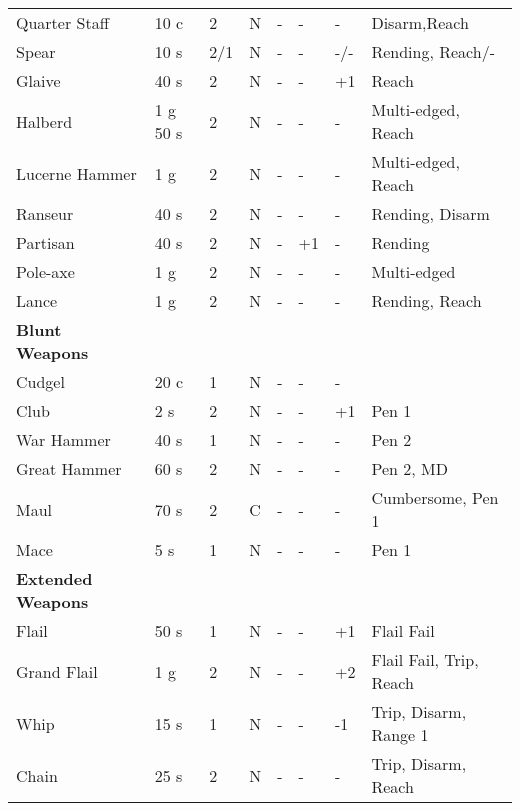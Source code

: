 \begin{table}[ht!]
\begin{tabular}{|l|l|l|l|l|l|l|l|}
		Quarter Staff & 10 c & 2 &  N & - & - & - & Disarm,Reach\\
		Spear & 10 s & 2/1 & N & - & - & -/- & Rending, Reach/- \\
		Glaive & 40 s & 2 & N & - & - & +1 & Reach \\
		Halberd & 1 g 50 s & 2 & N & - & - & - & Multi-edged, Reach\\
		Lucerne Hammer & 1 g & 2 & N & - & - & - & Multi-edged, Reach\\ 
		Ranseur & 40 s & 2 & N & - & - & - & Rending, Disarm \\ 
		Partisan & 40 s & 2 & N & - & +1 & - & Rending\\
        Pole-axe & 1 g & 2 & N & - & - & - & Multi-edged \\
		Lance & 1 g & 2 & N & - & - & - & Rending, Reach\\
		\hline
		\textbf{Blunt Weapons} & & & & & & & \\
		\hline
		Cudgel & 20 c & 1  & N & - & - & - &  \\
		Club & 2 s & 2 & N & - & - & +1 & Pen 1 \\
		War Hammer & 40 s & 1 & N & - & - & - & Pen 2 \\ 
		Great Hammer & 60 s & 2 & N & - & - & - & Pen 2, MD \\
		Maul & 70 s & 2 & C & - & - & - & Cumbersome, Pen 1 \\
		Mace & 5 s & 1 & N & - & - & - & Pen 1 \\
		\hline
		\textbf{Extended Weapons} & & & & & & & \\
		\hline
		Flail & 50 s & 1 & N & - & - & +1 & Flail Fail \\ 
		Grand Flail & 1 g & 2 & N & - & - & +2 & Flail Fail, Trip, Reach \\
		Whip & 15 s & 1 & N & - & - & -1 & Trip, Disarm, Range 1\\
		Chain & 25 s & 2 & N & - & - & - & Trip, Disarm, Reach\\  
		\hline
	\end{tabular}
\end{table}
